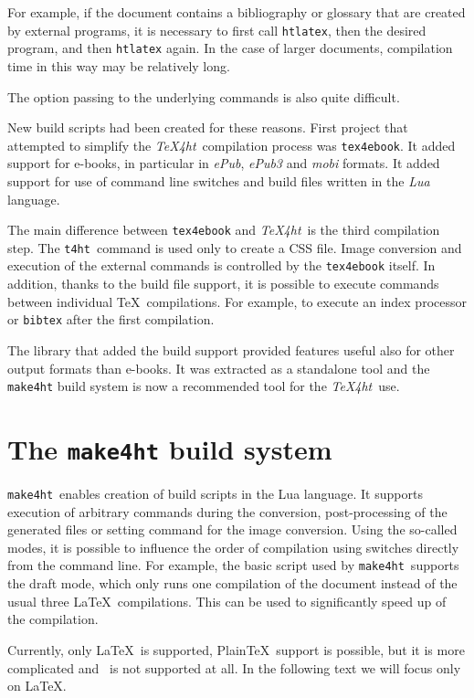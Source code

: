 \documentclass{ltugproc}
\newcommand\term[1]{\textit{#1}}
\newcommand\command[1]{\texttt{#1}}
\newcommand\texfourht{\term{\TeX\-4ht}}
\newcommand\tfourhtcmd{\command{t4ht}}
\newcommand\makefourht{\command{make4ht}}
\begin{document}
For example, if the document contains a bibliography or
glossary that are created by external programs, it is necessary to first call
\command{htlatex}, then the desired program, and then \command{htlatex} again.
In the case of larger documents, compilation time in this way may be relatively
long.

The option passing to the underlying commands is also quite difficult.

New build scripts had been created for these reasons. First project that
attempted to simplify the \texfourht\ compilation process was
\command{tex4ebook}. It added support for e-books, in particular in
\term{ePub}, \term{ePub3} and \term{mobi} formats. It added support for use of
command line switches and build files written in the \term{Lua} language.

The main difference between \command{tex4ebook} and \texfourht\ is the third compilation
step. The \tfourhtcmd\ command is used only to create a CSS file. 
Image conversion and execution of the external commands is controlled by the
\command{tex4ebook} itself. In addition, thanks to the build file support, it
is possible to execute commands between individual \TeX\ compilations. For
example, to execute an index processor or \command{bibtex}
after the first compilation.

The library that added the build support provided 
features useful also for other output formats than e-books. It
was extracted as a standalone tool and the \command{make4ht} build system is now a
recommended tool for the \texfourht\ use.


\section{The \command{make4ht} build system}

\makefourht\ enables creation of build scripts in the Lua language. 
It supports execution of arbitrary commands during the conversion,
post-processing of the generated files or setting command for the image
conversion.
Using the so-called modes, it is possible to 
influence the order of compilation using switches directly from the   command
line. For example, the basic script used by \makefourht\ supports the draft mode, which
only runs one compilation of the document instead of the usual three \LaTeX\ compilations. This can
be used to significantly  speed up of the  compilation. 

Currently, only \LaTeX\ is supported, Plain\TeX\ support  is possible, but it is
more complicated and \ConTeXt\ is not supported at all. In the following text we
will focus only on \LaTeX.
\end{document}
